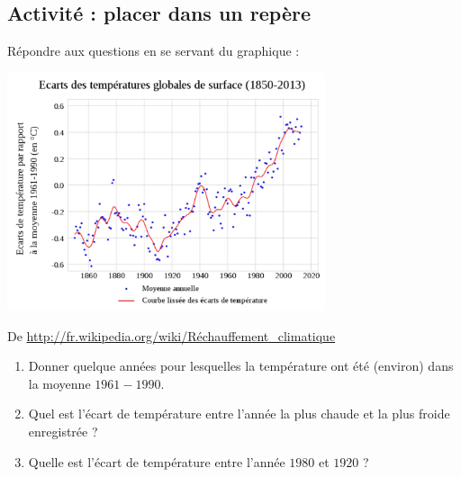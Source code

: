 
\subsection*{Activité : placer dans un repère}

Répondre aux questions en se servant du graphique :

\includegraphics[width=0.7\textwidth]{EcartsTempSurface2013.pdf}

De \url{http://fr.wikipedia.org/wiki/Réchauffement_climatique}


\begin{enumerate}
    \item
        Donner quelque années pour lesquelles la température ont été (environ) dans la moyenne \( 1961-1990\).
    \item
        Quel est l'écart de température entre l'année la plus chaude et la plus froide enregistrée ?
    \item
        Quelle est l'écart de température entre l'année \( 1980\) et \( 1920\) ?
\end{enumerate}
